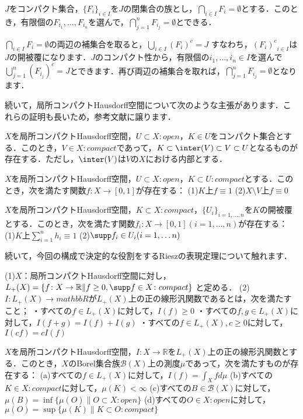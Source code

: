 \begin{lem}\label{4}
$J$をコンパクト集合，$\{ F_i \}_{i \in I}$を$J$の閉集合の族とし，$\bigcap_{i \in I}F_i = \emptyset$とする．このとき，有限個の$F_{i_1}, \ldots , F_{i_n}$を選んで，$\bigcap_{j=1}^{n}F_{i_j} = \emptyset$とできる．
\end{lem}
\begin{Proof}
$\bigcap_{i \in I}F_i = \emptyset$の両辺の補集合を取ると，$\bigcup_{i \in I}(F_i)^{c} = J$ すなわち，${(F_i)^{c}}_{i \in I}$は$J$の開被覆になります．$J$のコンパクト性から，有限個の$i_1, \ldots , i_n \in I$を選んで$\bigcup_{j=1}^{n}(F_{i_j})^{c} = J$とできます．再び両辺の補集合を取れば，$\bigcap_{j=1}^{n}F_{i_j} = \emptyset$となります．
\end{Proof}
続いて，局所コンパクトHausdorff空間について次のような主張があります．これらの証明も長いため，参考文献に譲ります．
\begin{thm}\label{5}
$X$を局所コンパクトHausdorff空間，$U \subset X \colon open$，$K \in U$をコンパクト集合とする．このとき，$V \in X :compact$であって，$K \subset \inter(V) \subset V \subset U$となるものが存在する．ただし，$\inter(V)$は$V$の$X$における内部とする．
\end{thm}
\begin{thm}[Urysohnの補題]\label{6}
$X$を局所コンパクトHausdorff空間，$U \subset X \colon open$，$K \subset U \colon compact$とする．このとき，次を満たす関数$f \colon X \to [0, 1]$が存在する：
(1)$K$上$f \equiv 1$
(2)$X \setminus V$上$f \equiv 0$
\end{thm}
\begin{thm}[1の分割]\label{7}
$X$を局所コンパクトHausdorff空間，$K \subset X \colon compact$，$\{ U_i \}_{i=1, \ldots , n}$を$K$の開被覆とする．このとき，次を満たす関数$f_i \colon X \to [0,1] (i=1, \ldots , n)$が存在する：
(1)$K$上$\sum_{i=1}^{n}h_i \equiv 1$
(2)$\supp f_i \in U_i (i=1, \ldots n)$
\end{thm}
続いて，今回の構成で決定的な役割をするRieszの表現定理について触れます．
\begin{defi}\label{8}
(1)$X$：局所コンパクトHausdorff空間に対し，
$L_{+}(X)= \{ f \colon X \to \mathbb{R} \| f \ge 0, \supp f \in X \colon compact\}$ と定める．
(2)$I \colon L_{+}(X) \to mathbb{R}$が$L_{+}(X)$上の正の線形汎関数であるとは，次を満たすこと；
・すべての$f \in L_{+}(X)$に対して，$I(f) \ge 0$
・すべての$f,g \in L_{+}(X)$に対して，$I(f+g)=I(f)+I(g)$
・すべての$f \in L_{+}(X), c \ge 0$に対して，$I(cf)=cI(f)$
\end{defi}
\begin{thm}[Rieszの表現定理]\label{9}
$X$を局所コンパクトHausdorff空間，$I \colon X \to \mathbb{R}$を$L_{+}(X)$上の正の線形汎関数とする．このとき，$X$のBorel集合族$\mathscr{B}(X)$上の測度$\mu$であって，次を満たすものが存在する：
(a)すべての$f \in L_{+}(X)$に対して，$I(f)=\int_{X}fd\mu$
(b)すべての$K \in X \colon compact$に対して，$\mu(K)<\infty$
(c)すべての$B \in \mathscr{B}(X)$に対して，$\mu(B)=\inf \{ \mu(O) \| O \subset X \colon open \}$
(d)すべての$O \in X \colon open$に対して，$\mu(O)=\sup \{ \mu(K) \| K \subset O \colon compact \}$
\end{thm}
